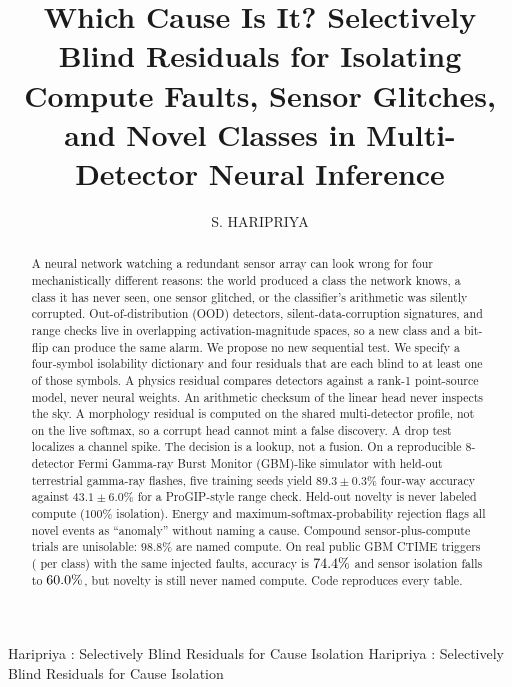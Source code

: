 \documentclass{ieeeaccess}
\begin{document}

\title{Which Cause Is It? Selectively Blind Residuals for Isolating Compute Faults, Sensor Glitches, and Novel Classes in Multi-Detector Neural Inference}

\author{\uppercase{S. Haripriya}}
\address[1]{School of Computer Science and Engineering, Vellore Institute of Technology, Chennai 600127, India (e-mail: hariripriya.subbiah@gmail.com)}

\markboth
{Haripriya \headeretal: Selectively Blind Residuals for Cause Isolation}
{Haripriya \headeretal: Selectively Blind Residuals for Cause Isolation}


\begin{abstract}
A neural network watching a redundant sensor array can look wrong for four mechanistically different reasons: the world produced a class the network knows, a class it has never seen, one sensor glitched, or the classifier's arithmetic was silently corrupted. Out-of-distribution (OOD) detectors, silent-data-corruption signatures, and range checks live in overlapping activation-magnitude spaces, so a new class and a bit-flip can produce the same alarm. We propose no new sequential test. We specify a four-symbol isolability dictionary and four residuals that are each blind to at least one of those symbols. A physics residual compares detectors against a rank-1 point-source model, never neural weights. An arithmetic checksum of the linear head never inspects the sky. A morphology residual is computed on the shared multi-detector profile, not on the live softmax, so a corrupt head cannot mint a false discovery. A drop test localizes a channel spike. The decision is a lookup, not a fusion. On a reproducible 8-detector Fermi Gamma-ray Burst Monitor (GBM)-like simulator with held-out terrestrial gamma-ray flashes, five training seeds yield $89.3\pm0.3\%$ four-way accuracy against $43.1\pm6.0\%$ for a ProGIP-style range check. Held-out novelty is never labeled compute ($100\%$ isolation). Energy and maximum-softmax-probability rejection flags all novel events as ``anomaly'' without naming a cause. Compound sensor-plus-compute trials are unisolable: $98.8\%$ are named compute. On \RealCubes{} real public GBM CTIME triggers (\RealPerClass{} per class) with the same injected faults, accuracy is $74.4\%$ and sensor isolation falls to $60.0\%$, but novelty is still never named compute. Code reproduces every table.
\end{abstract}
\end{document}
